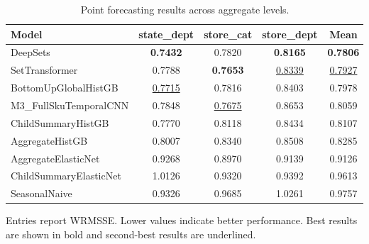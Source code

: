 \begin{table}[H]
\centering
\caption{Point forecasting results across aggregate levels.}
\label{tab:main_point}
\begin{threeparttable}
\begin{tabular}{lcccc}
\toprule
Model & state\_dept & store\_cat & store\_dept & Mean \\
\midrule
DeepSets & \textbf{0.7432} & 0.7820 & \textbf{0.8165} & \textbf{0.7806} \\
SetTransformer & 0.7788 & \textbf{0.7653} & \underline{0.8339} & \underline{0.7927} \\
BottomUpGlobalHistGB & \underline{0.7715} & 0.7816 & 0.8403 & 0.7978 \\
M3\_FullSkuTemporalCNN & 0.7848 & \underline{0.7675} & 0.8653 & 0.8059 \\
ChildSummaryHistGB & 0.7770 & 0.8118 & 0.8434 & 0.8107 \\
AggregateHistGB & 0.8007 & 0.8340 & 0.8508 & 0.8285 \\
AggregateElasticNet & 0.9268 & 0.8970 & 0.9139 & 0.9126 \\
ChildSummaryElasticNet & 1.0126 & 0.9320 & 0.9392 & 0.9613 \\
SeasonalNaive & 0.9326 & 0.9685 & 1.0261 & 0.9757 \\
\bottomrule
\end{tabular}
\begin{tablenotes}
\footnotesize \item Entries report WRMSSE. Lower values indicate better performance. Best results are shown in bold and second-best results are underlined.
\end{tablenotes}
\end{threeparttable}
\end{table}
